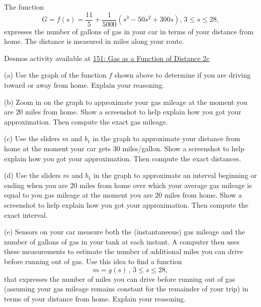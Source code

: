 \documentclass{ximera}
\begin{document}
\begin{question} \label{Qdsfsadgt4e}
The function 
\[
   G = f(s) = \frac{11}{5} +\frac{1}{5000}\left( s^3-50s^2+300s \right) , \, 3\leq s \leq 28 ,
\]
expresses the number of gallons of gas in your car in terms of your distance from home. The distance is measured in miles along your route. 

\begin{onlineOnly}
    \begin{center}
\end{center}
\end{onlineOnly}

Desmos activity available at
\href{https://www.desmos.com/calculator/cphmgnrtm7}{151: Gas as a Function of Distance 2c}

(a) Use the graph of the function $f$ shown above to determine if you are driving toward or away from home. Explain your reasoning.

(b) Zoom in on the graph to approximate your gas mileage at the moment you are $20$ miles from home. Show a screenshot to help explain how you got your approximation. Then compute the exact gas mileage.

(c) Use the sliders $m$ and $b_1$ in the graph to approximate your distance from home at the moment your car gets $30$ miles/gallon. Show a screenshot to help explain how you got your approximation. Then compute the exact distances.

(d) Use the sliders $m$ and $b_1$ in the graph to approximate an interval beginning or ending when you are $20$ miles from home over which your average gas mileage is equal to you gas mileage at the moment you are $20$ miles from home. Show a screenshot to help explain how you got your approximation. Then compute the exact interval.

(e) Sensors on your car measure both the (instantaneous) gas mileage and the number of gallons of gas in your tank at each instant. A computer then uses these measurements to estimate the number of additional miles you can drive before running out of gas. Use this idea to find a function 
\[
  m =g(s) \, , \, 3\leq s \leq 28 ,
\]
that expresses the number of miles you can drive before running out of gas (assuming your gas mileage remains constant for the remainder of your trip) in terms of your distance from home. Explain your reasoning. 

\end{question}
\end{document}
